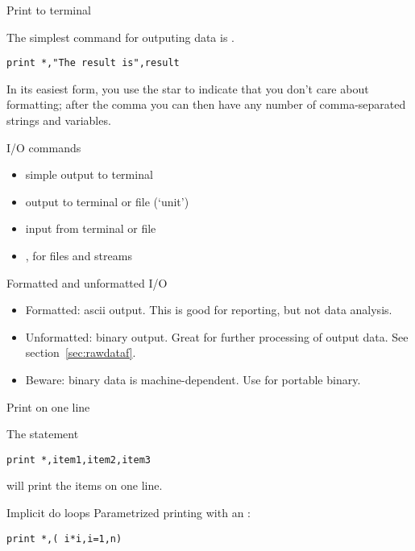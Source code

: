 
 {Print to terminal}

The simplest command for outputing data is .
\begin{verbatim}
print *,"The result is",result
\end{verbatim}
In its easiest form, you use the star to indicate that you don't care
about formatting; after the comma you can then have any number of
comma-separated strings and variables.

\begin{slide}{I/O commands}
  \label{sl:fio-commands}
  \begin{itemize}
  \item {} simple output to terminal
  \item {} output to terminal or file (`unit')
  \item {} input from terminal or file
  \item {},  for files and streams
  \end{itemize}
\end{slide}

\begin{block}{Formatted and unformatted I/O}
  \begin{itemize}
  \item Formatted: ascii output. This is good for reporting, but not
    data analysis.
  \item Unformatted: binary output. Great for further processing of
    output data. See section~\ref{sec:rawdataf}.
  \item Beware: binary data is machine-dependent. Use 
    for portable binary.
  \end{itemize}
\end{block}

 {Print on one line}

The statement
\begin{verbatim}
print *,item1,item2,item3
\end{verbatim}
will print the items on one line.

\begin{block}{Implicit do loops}
  \label{sl:print-implicit-loop}
  Parametrized printing with an :
\begin{verbatim}
print *,( i*i,i=1,n)
\end{verbatim}
\end{block}

